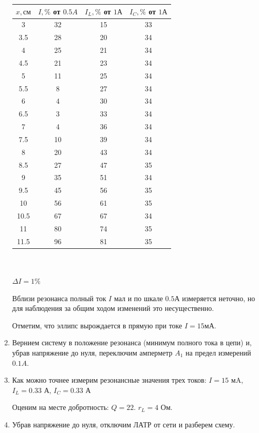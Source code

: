 \documentclass[a4paper, 12pt]{article}
\begin{document}
\begin{enumerate}
    \begin{tabular}{|c|c|c|c|}
        \hline
        $x, см$ & $I, \%$ от $0.5 A$ & $I_L, \%$ от $1 А$ & $I_C, \%$ от $1 А$ \\ \hline
        3 & 32 & 15 & 33 \\ \hline
        3.5 & 28 & 20 & 34 \\ \hline
        4 & 25 & 21 & 34 \\ \hline
        4.5 & 21 & 23 & 34 \\ \hline
        5 & 11 & 25 & 34 \\ \hline
        5.5 & 8 & 27 & 34 \\ \hline
        6 & 4 & 30 & 34 \\ \hline
        6.5 & 3 & 33 & 34 \\ \hline
        7 & 4 & 36 & 34 \\ \hline
        7.5 & 10 & 39 & 34 \\ \hline
        8 & 20 & 43 & 34 \\ \hline
        8.5 & 27 & 47 & 35 \\ \hline
        9 & 35 & 51 & 34 \\ \hline
        9.5 & 45 & 56 & 35 \\ \hline
        10 & 56 & 61 & 35 \\ \hline
        10.5 & 67 & 67 & 34 \\ \hline
        11 & 80 & 74 & 35 \\ \hline
        11.5 & 96 & 81 & 35 \\ \hline
    \end{tabular}
    \\\\
    $\Delta I = 1 \%$

    Вблизи резонанса полный ток $I$ мал и по шкале $0.5 А$ измеряется неточно, но для наблюдения за общим ходом изменений это несущественно.

    Отметим, что эллипс вырождается в прямую при токе $I = 15 мА$.

    \item Вернием систему в положение резонанса (минимум полного тока в цепи) и, убрав напряжение до нуля, переключим амперметр $A_1$ на предел измерений $0.1 A$.
    
    \item Как можно точнее измерим резонансные значения трех токов: $I = 15$ мA, $I_L = 0.33$ А, $I_C = 0.33$ А
    
    Оценим на месте добротность: $Q = 22$. $r_L = 4$ Ом.

    \item Убрав напряжение до нуля, отключим ЛАТР от сети и разберем схему.
\end{enumerate}
\end{document}
